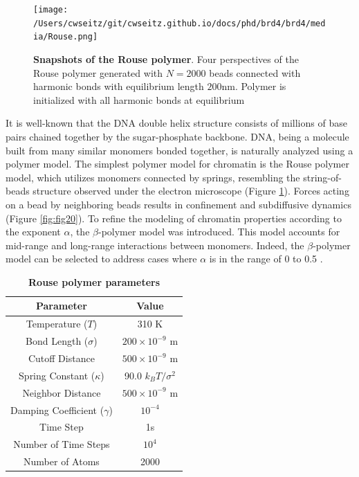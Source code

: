 \begin{figure}[t]
\texttt{[image: /Users/cwseitz/git/cwseitz.github.io/docs/phd/brd4/brd4/media/Rouse.png]}
\caption{\textbf{Snapshots of the Rouse polymer}. Four perspectives of the Rouse polymer generated with $N=2000$ beads connected with harmonic bonds with equilibrium length $200\mathrm{nm}$. Polymer is initialized with all harmonic bonds at equilibrium}
\label{fig:fig19}
\end{figure}


It is well-known that the DNA double helix structure consists of millions of base pairs chained together by the sugar-phosphate backbone. DNA, being a molecule built from many similar monomers bonded together, is naturally analyzed using a polymer model. The simplest polymer model for chromatin is the Rouse polymer model, which utilizes monomers connected by springs, resembling the string-of-beads structure observed under the electron microscope (Figure \ref{fig:fig19}). Forces acting on a bead by neighboring beads results in confinement and subdiffusive dynamics (Figure \ref{fig:fig20}). To refine the modeling of chromatin properties according to the exponent $\alpha$, the $\beta$-polymer model was introduced. This model accounts for mid-range and long-range interactions between monomers. Indeed, the $\beta$-polymer model can be selected to address cases where $\alpha$ is in the range of 0 to 0.5 \parencite{Amitai2013,Amitai2017,Hajjoul2013}.

\begin{table}[h!]
\centering
\begin{tabular}{|c|c|}
\hline
\textbf{Parameter} & \textbf{Value} \\ \hline
Temperature ($T$) & 310 K \\ \hline
Bond Length ($\sigma$) & $200 \times 10^{-9}$ m \\ \hline
Cutoff Distance & $500 \times 10^{-9}$ m \\ \hline
Spring Constant ($\kappa$) & 90.0 $k_{B}T/\sigma^2$ \\ \hline
Neighbor Distance & $500 \times 10^{-9}$ m \\ \hline
Damping Coefficient ($\gamma$) & $10^{-4}$ \\ \hline
Time Step & 1s\\ \hline
Number of Time Steps & $10^4$ \\ \hline
Number of Atoms & 2000 \\ \hline
\end{tabular}
\caption{\textbf{Rouse polymer parameters}}
\end{table}

